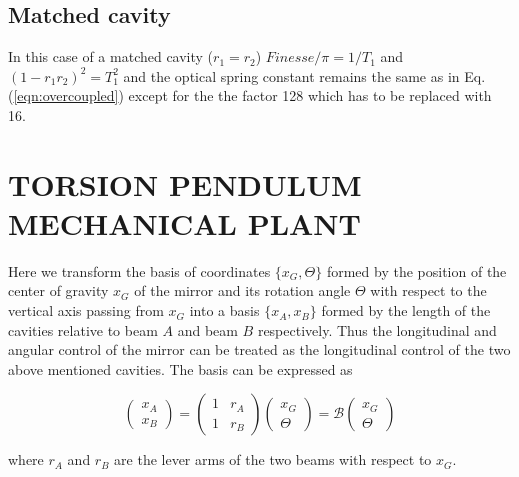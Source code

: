 \subsection{Matched cavity}

In this case of a matched cavity ($r_1=r_2$) $Finesse/\pi=1/T_1$ and $(1-r_1r_2)^2=T_1^2$ and the optical spring constant remains the same as in Eq. (\ref{eqn:overcoupled}) except for the the factor 128 which has to be replaced with 16.



\section{TORSION PENDULUM MECHANICAL PLANT}
\label{app:B} 

Here we transform
the basis of coordinates $\{x_G,\Theta\}$  formed by the position of the center of gravity $x_G$ of the mirror and its rotation angle $\Theta$  with respect to the vertical axis passing from $x_G$ into a basis $\{x_A,x_B\}$ formed by the length of the cavities relative to beam $A$ and beam $B$ respectively. Thus the longitudinal and angular control of the mirror can be treated as the longitudinal control of the two above mentioned cavities. The basis can be expressed as
%

\begin{equation}
\label{eqn:BDEF}
\begin{pmatrix}
x_A \\ x_B
\end{pmatrix}
=
 \begin{pmatrix}
1& r_A\\1& r_B
\end{pmatrix} 
\begin{pmatrix}
x_G\\ \Theta
\end{pmatrix}
=
\mathcal{B}
\begin{pmatrix}
x_G\\ \Theta
\end{pmatrix}
\end{equation}

where $r_A$ and $r_B$ are the lever arms of the two beams with respect to $x_G$.

